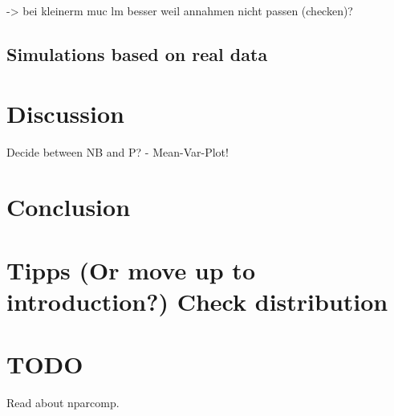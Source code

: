 \documentclass{scrartcl}\usepackage[]{graphicx}\usepackage[]{color}
\begin{document}
-> bei kleinerm muc lm besser weil annahmen nicht passen (checken)?

\subsection{Simulations based on real data}

\section{Discussion}

Decide between NB and P? - Mean-Var-Plot!

\section{Conclusion}

\appendix
\section{Tipps
(Or move up to introduction?)
Check distribution}


\section{TODO}
Read about nparcomp.
\end{document}
